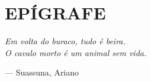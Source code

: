 \section*{EPÍGRAFE}
\vspace*{\fill}

{\setlength{\parindent}{0cm}
    \begin{quoting}[rightmargin=0pt,leftmargin=0.4\textwidth]
        \begin{singlespace}
            \begin{Large}
                \rmfamily\itshape
                Em volta do buraco, tudo é beira.\\
                O cavalo morto é um animal sem vida.\\
                \bigskip

                --- Suassuna, Ariano
            \end{Large}
        \end{singlespace}
    \end{quoting}
}

\bigskip\bigskip\bigskip\bigskip
\pagebreak
